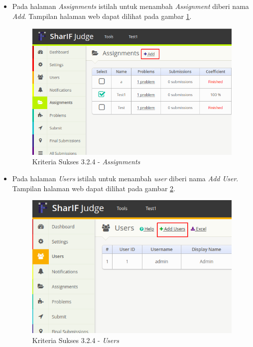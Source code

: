 \documentclass[a4paper,twoside]{article}
\begin{document}
\begin{enumerate}
		\begin{itemize}
			\item Pada halaman \textit{Assignments} istilah untuk menambah \textit{Assignment} diberi nama \textit{Add}. Tampilan halaman web dapat dilihat pada gambar \ref{fig:kepatuhan_3_2_4_assignments}.
			\begin{figure}[H]
				\centering  
				\includegraphics[scale=0.5]{kepatuhan_3_2_4_assignments}  
				\caption[Kriteria Sukses 3.2.4 - \textit{Assignments}]{Kriteria Sukses 3.2.4 - \textit{Assignments}} 
				\label{fig:kepatuhan_3_2_4_assignments} 
			\end{figure}
			
			\item Pada halaman \textit{Users} istilah untuk menambah \textit{user} diberi nama \textit{Add User}. Tampilan halaman web dapat dilihat pada gambar \ref{fig:kepatuhan_3_2_4_users}.
			\begin{figure}[H]
				\centering  
				\includegraphics[scale=0.5]{kepatuhan_3_2_4_users}  
				\caption[Kriteria Sukses 3.2.4 - \textit{Users}]{Kriteria Sukses 3.2.4 - \textit{Users}} 
				\label{fig:kepatuhan_3_2_4_users} 
			\end{figure}
			

\end{itemize}
\end{enumerate}
\end{document}
